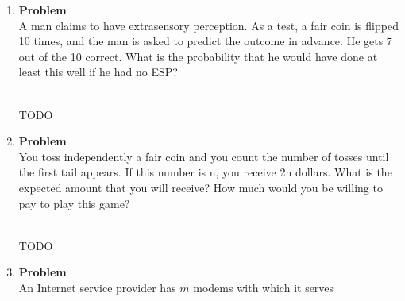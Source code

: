 \documentclass[12pt]{article}
\newenvironment{Ex}{\textbf{Problem}\vspace{.75em}\\}{}
\begin{document}
\begin{enumerate}
\begin{Ex}
      \begin{equation*}
        \begin{aligned}
          p_N(n) = \frac{10^ne^{-10}}{n!} \quad && n = 0, 1, \ldots
        \end{aligned}
      \end{equation*}
      \begin{enumerate}
      \item What is the probability that at least two calls arrive
        within one hour?
      \item What is the probability that at most three calls arrive
        within one hour?
      \item What is the probability that the number of calls that
        arrive within one hour is greater than three but less than or
        equal to six?
      \end{enumerate}
      \begin{solution} \hfill \\
        {\huge TODO}
      \end{solution}
    \end{Ex}
  \item 
    \begin{Ex}
      A man claims to have extrasensory perception. As a test, a fair
      coin is flipped 10 times, and the man is asked to predict the
      outcome in advance. He gets 7 out of the 10 correct. What is the
      probability that he would have done at least this well if he had
      no ESP?
      \begin{solution} \hfill \\
        {\huge TODO}
      \end{solution}
    \end{Ex}
  \item 
    \begin{Ex}
      You toss independently a fair coin and you count the number of
      tosses until the first tail appears. If this number is n, you
      receive 2n dollars. What is the expected amount that you will
      receive? How much would you be willing to pay to play this game?
      \begin{solution} \hfill \\
        {\huge TODO}
      \end{solution}
    \end{Ex}
  \item 
    \begin{Ex}
      An Internet service provider has $m$ modems with which it serves

\end{Ex}
\end{enumerate}
\end{document}
